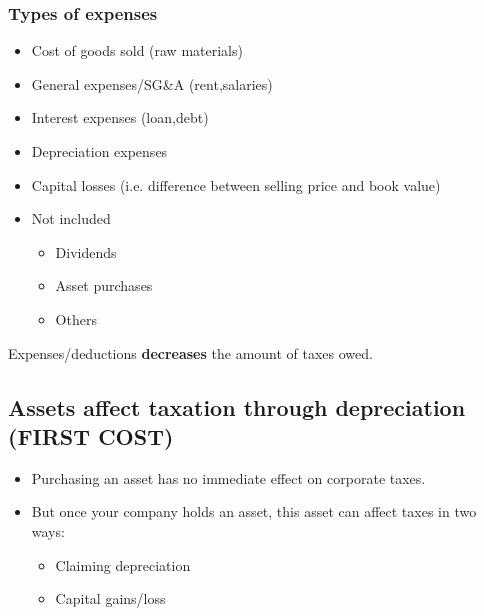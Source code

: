 \subsubsection{Types of expenses}
\begin{terminology}
    \begin{itemize}
        \item Cost of goods sold (raw materials)
        \item General expenses/SG\&A (rent,salaries)
        \item Interest expenses (loan,debt)
        \item Depreciation expenses
        \item Capital losses (i.e. difference between selling price and book value)
        \item Not included
        \begin{itemize}
            \item Dividends 
            \item Asset purchases 
            \item Others
        \end{itemize}
    \end{itemize}            
\end{terminology}

\begin{warning}
    Expenses/deductions \textbf{decreases} the amount of taxes owed.
\end{warning}

\subsection{Assets affect taxation through depreciation (FIRST COST)}
\begin{definition}
    \begin{itemize}
        \item Purchasing an asset has no immediate effect on corporate taxes.
        \item But once your company holds an asset, this asset can affect taxes in two ways:
        \begin{itemize}
            \item Claiming depreciation
            \item Capital gains/loss
        \end{itemize}
    \end{itemize}
\end{definition}

